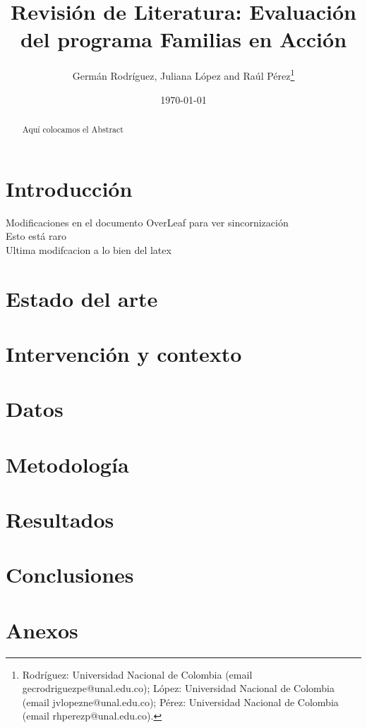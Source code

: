 \documentclass[AER]{AEA}
\begin{document}
\title{Revisión de Literatura: Evaluación del programa Familias en Acción}
\author{Germán Rodríguez, Juliana López and Raúl Pérez\thanks{Rodríguez: Universidad Nacional de Colombia (email gecrodriguezpe@unal.edu.co); López: Universidad Nacional de Colombia (email jvlopezne@unal.edu.co); Pérez: Universidad Nacional de Colombia (email rhperezp@unal.edu.co).}}
\date{\today}

\begin{abstract}
Aquí colocamos el Abstract
\end{abstract}

\maketitle

\section{Introducción}

Modificaciones en el documento OverLeaf para ver sincornización \\
Esto está raro \\
Ultima modifcacion a lo bien del latex


\section{Estado del arte}

\section{Intervención y contexto}

\section{Datos}

\section{Metodología}

\section{Resultados}

\section{Conclusiones}

\section{Anexos}

\newpage


\end{document}
